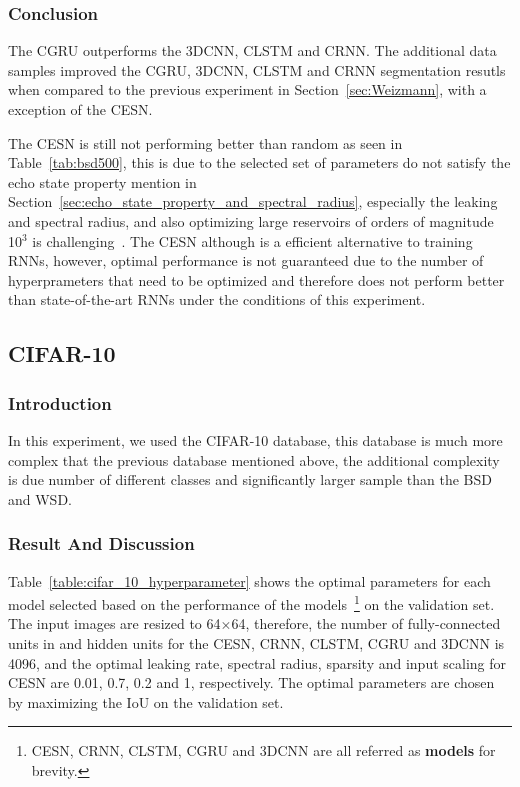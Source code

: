 \documentclass{WitsPhysicsReport}
\begin{document}
\subsubsection{Conclusion}

The CGRU outperforms the 3DCNN, CLSTM and CRNN. The additional data samples improved the CGRU, 3DCNN, CLSTM and CRNN segmentation resutls when compared to the previous experiment in Section~\ref{sec:Weizmann}, with a exception of the CESN. 

The CESN is still not performing better than random as seen in Table~\ref{tab:bsd500}, this is due to the selected set of parameters do not satisfy the echo state property mention in Section~\ref{sec:echo_state_property_and_spectral_radius}, especially the leaking and spectral radius, and also optimizing large reservoirs of orders of magnitude 10$^3$ is challenging~\cite{jaeger2001echo}. The CESN although is a efficient alternative to training RNNs, however, optimal performance is not guaranteed due to the number of hyperprameters that need to be optimized and therefore does not perform better than state-of-the-art RNNs under the conditions of this experiment.

\newpage


\subsection{CIFAR-10}
\label{sec:cifar_10}

\subsubsection{Introduction}

In this experiment, we used the CIFAR-10 database, this database is much more complex that the previous database mentioned above, the additional complexity is due number of different classes and significantly larger sample than the BSD and WSD.

\subsubsection{Result And Discussion}
Table~\ref{table:cifar_10_hyperparameter} shows the optimal parameters for each model selected based on the performance of the models~\footnote{CESN, CRNN, CLSTM, CGRU and 3DCNN are all referred as \textbf{models} for brevity.} on the validation set. The input images are resized to 64$\times$64, therefore, the number of fully-connected units in and hidden units for the CESN, CRNN, CLSTM, CGRU and 3DCNN is 4096, and the optimal leaking rate, spectral radius, sparsity and input scaling for CESN are 0.01, 0.7, 0.2 and 1, respectively. The optimal parameters are chosen by maximizing the IoU on the validation set.
\end{document}
